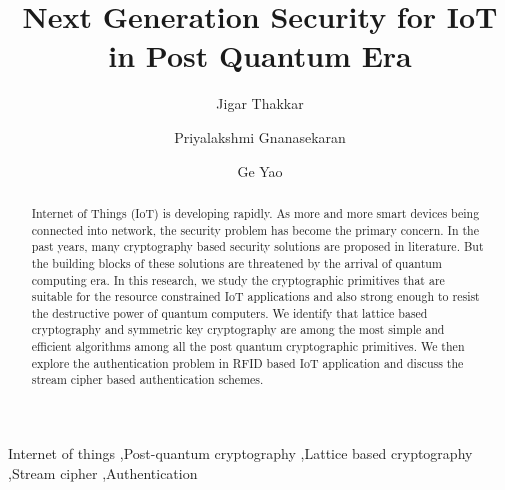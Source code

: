 \documentclass[preprint,10pt,5p]{elsarticle}
\begin{document}
\begin{frontmatter}

\title{Next Generation Security for IoT in Post Quantum Era}


 
\author[label1]{Jigar Thakkar}
\address[label1]{School of Computing and Information Systems,The University of Melbourne, Australia, thakkarj@student.unimelb.edu.au}



\author[label2]{Priyalakshmi Gnanasekaran}
\address[label2]{School of Computing and Information Systems,The University of Melbourne, Australia, pgnanasekara@student.unimelb.edu.au}

\author[label3]{Ge Yao}
\address[label3]{School of Computing and Information Systems,The University of Melbourne, Australia, gyao1@student.unimelb.edu.au}

\begin{abstract}
Internet of Things (IoT) is developing rapidly. As more and more smart devices being connected into network, the security problem has become the primary concern. In the past years, many cryptography based security solutions are proposed in literature. But the building blocks of these solutions are threatened by the arrival of quantum computing era. In this research, we study the cryptographic primitives that are suitable for the resource constrained IoT applications and also strong enough to resist the destructive power of quantum computers. We identify that lattice based cryptography and symmetric key cryptography are among the most simple and efficient algorithms among all the post quantum cryptographic primitives. We then explore the authentication problem in RFID based IoT application and discuss the stream cipher based authentication schemes.  

\end{abstract}

\begin{keyword}
Internet of things \sep Post-quantum cryptography \sep Lattice based cryptography \sep Stream cipher \sep Authentication
\end{keyword}

\end{frontmatter}
\end{document}
